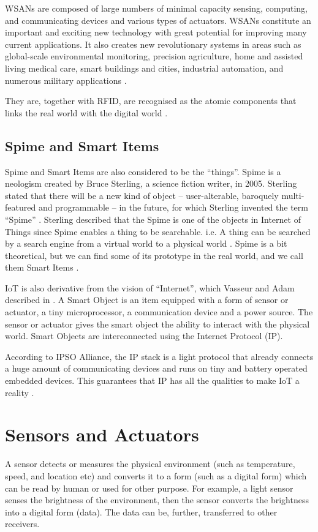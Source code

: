 WSANs are composed of large numbers of minimal capacity sensing, computing, and communicating devices and various types of actuators. WSANs constitute an important and exciting new technology with great potential for improving many current applications. It also creates new revolutionary systems in areas such as global-scale environmental monitoring, precision agriculture, home and assisted living medical care, smart buildings and cities, industrial automation, and numerous military applications \cite{stankovic2008sensor}. 

They are, together with RFID, are recognised as the atomic components that links the real world with the digital world \cite{sterling2005shaping}.

\subsection{Spime and Smart Items}

Spime and Smart Items are also considered to be the ``things''. Spime is a neologism created by Bruce Sterling, a science fiction writer, in 2005. Sterling stated that there will be a new kind of object -- user-alterable, baroquely multi-featured and programmable -- in the future, for which Sterling invented the term ``Spime'' \cite{sterling2005shaping}. Sterling described that the Spime is one of the objects in Internet of Things since Spime enables a thing to be searchable. i.e. A thing can be searched by a search engine from a virtual world to a physical world \cite{sterling2005shaping}. Spime is a bit theoretical, but we can find some of its prototype in the real world, and we call them Smart Items \cite{atzori2010internet}.

IoT is also derivative from the vision of ``Internet'', which Vasseur and Adam described in \cite{vasseur2010interconnecting}. A Smart Object is an item equipped with a form of sensor or actuator, a tiny microprocessor, a communication device and a power source. The sensor or actuator gives the smart object the ability to interact with the physical world. Smart Objects are interconnected using the Internet Protocol (IP). 

According to IPSO Alliance, the IP stack is a light protocol that already connects a huge amount of communicating devices and runs on tiny and battery operated embedded devices. This guarantees that IP has all the qualities to make IoT a reality \cite{atzori2010internet}.

\section{Sensors and Actuators}
A sensor detects or measures the physical environment (such as temperature, speed, and location etc) and converts it to a form (such as a digital form) which can be read by human or used for other purpose. For example, a light sensor senses the brightness of the environment, then the sensor converts the brightness into a digital form (data). The data can be, further, transferred to other receivers.

